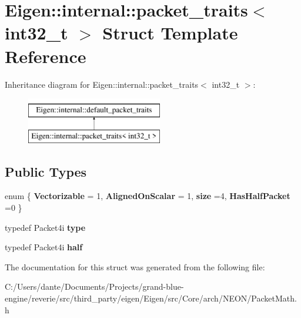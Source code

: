 \hypertarget{struct_eigen_1_1internal_1_1packet__traits_3_01int32__t_01_4}{}\section{Eigen\+::internal\+::packet\+\_\+traits$<$ int32\+\_\+t $>$ Struct Template Reference}
\label{struct_eigen_1_1internal_1_1packet__traits_3_01int32__t_01_4}
Inheritance diagram for Eigen\+::internal\+::packet\+\_\+traits$<$ int32\+\_\+t $>$\+:\begin{figure}[H]
\begin{center}
\leavevmode
\includegraphics[height=2.000000cm]{struct_eigen_1_1internal_1_1packet__traits_3_01int32__t_01_4}
\end{center}
\end{figure}
\subsection*{Public Types}
\begin{DoxyCompactItemize}
\item 
\mbox{\label{struct_eigen_1_1internal_1_1packet__traits_3_01int32__t_01_4_afab0718a2d55e709976cf903c34bf729}} 
enum \{ {\bfseries Vectorizable} = 1, 
{\bfseries Aligned\+On\+Scalar} = 1, 
{\bfseries size} =4, 
{\bfseries Has\+Half\+Packet} =0
 \}
\item 
\mbox{\label{struct_eigen_1_1internal_1_1packet__traits_3_01int32__t_01_4_a95a9e2ef8a70b73583b20c8835f1e9e2}} 
typedef Packet4i {\bfseries type}
\item 
\mbox{\label{struct_eigen_1_1internal_1_1packet__traits_3_01int32__t_01_4_a430890b77e280a93bf22dd7bda3df6a4}} 
typedef Packet4i {\bfseries half}
\end{DoxyCompactItemize}


The documentation for this struct was generated from the following file\+:\begin{DoxyCompactItemize}
\item 
C\+:/\+Users/dante/\+Documents/\+Projects/grand-\/blue-\/engine/reverie/src/third\+\_\+party/eigen/\+Eigen/src/\+Core/arch/\+N\+E\+O\+N/Packet\+Math.\+h\end{DoxyCompactItemize}
